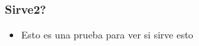 \begin{frame}[allowframebreaks]

  \frametitle{Sirve2?}

  \begin{itemize}
    \item Esto es una prueba para ver si sirve esto
  \end{itemize}

\end{frame}
